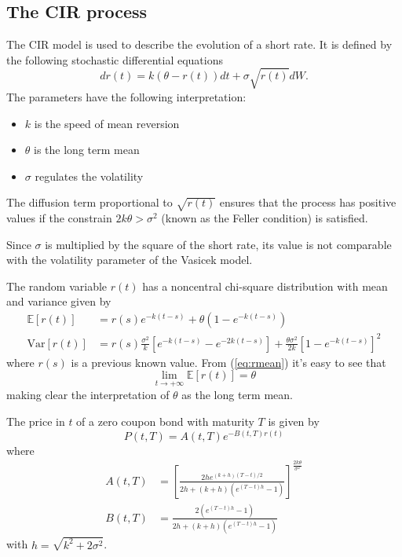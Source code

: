 \subsection{The CIR process}
The CIR model is used to describe the evolution of a short rate. It is defined by the following stochastic differential equations
\begin{equation}
dr(t) = k(\theta -r(t))dt + \sigma\sqrt{r(t)}dW.
\end{equation}
The parameters have the following interpretation:
\begin{itemize}
\item $k$ is the speed of mean reversion
\item $\theta$ is the long term mean
\item $\sigma$ regulates the volatility
\end{itemize}
The diffusion term proportional to $\sqrt{r(t)}$ ensures that the process has positive values if the constrain $2k\theta>\sigma^2$ (known as the Feller condition) is satisfied.

Since $\sigma$ is multiplied by the square of the short rate, its value is not comparable with the volatility parameter of the Vasicek model.

The random variable $r(t)$ has a noncentral chi-square distribution with mean and variance given by
\begin{align}
\mathbb{E}[r(t)] & = r(s)e^{-k(t-s)} + \theta(1-e^{-k(t-s)})\label{eq:rmean}\\
\mathrm{Var}[r(t)] & = r(s)\frac{\sigma^2}{k}\left[ e^{-k(t-s)} - e^{-2k(t-s)} \right] + \frac{\theta\sigma^2}{2k}\left[ 1 - e^{-k(t-s)} \right]^2
\end{align}
where $r(s)$ is a previous known value. From (\ref{eq:rmean}) it's easy to see that
\begin{equation}
\lim_{t\rightarrow +\infty}\mathbb{E}[r(t)] = \theta
\end{equation}
making clear the interpretation of $\theta$ as the long term mean.

The price in $t$ of a zero coupon bond with maturity $T$ is given by
\begin{equation}\label{eq:zcprice}
P(t,T) = A(t,T)e^{-B(t,T)r(t)}
\end{equation}
where
\begin{align}
A(t,T) & = \left[\frac{ 2he^{(k+h)(T-t)/2} }{ 2h + (k+h) (e^{(T-t)h}-1) }\right]^{\frac{2k\theta}{\sigma^2}}\\
B(t,T) & = \frac{ 2(e^{(T-t)h} -1) }{ 2h + (k+h) (e^{(T-t)h}-1) }
\end{align}
with $h = \sqrt{k^2 + 2\sigma^2}$.


